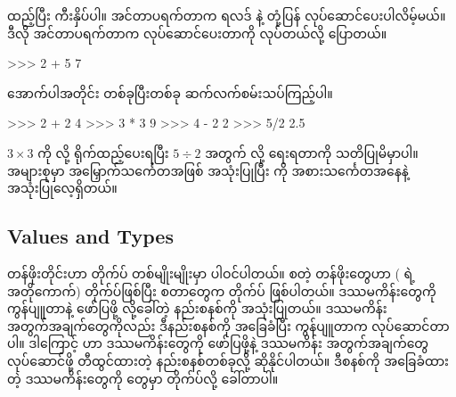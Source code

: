  ထည့်ပြီး  ကီးနှိပ်ပါ။ အင်တာပရက်တာက ရလဒ်  နဲ့ တုံ့ပြန် လုပ်ဆောင်ပေးပါလိမ့်မယ်။ ဒီလို အင်တာပရက်တာက လုပ်ဆောင်ပေးတာကို   လုပ်တယ်လို့ ပြောတယ်။
%
\setlength{\fboxsep}{0pt}
\begin{codetxt}
>>> 2 + 5
7
\end{codetxt}


%
အောက်ပါအတိုင်း တစ်ခုပြီးတစ်ခု ဆက်လက်စမ်းသပ်ကြည့်ပါ။
%
\setlength{\fboxsep}{0pt}
\begin{codetxt}
>>> 2 + 2
4
>>> 3 * 3
9
>>> 4 - 2
2
>>> 5/2
2.5
\end{codetxt}
%
$3 \times 3$ ကို  လို့ ရိုက်ထည့်ပေးရပြီး $5 \div 2$ အတွက်  လို့ ရေးရတာကို သတိပြုမိမှာပါ။  အများစုမှာ \fCode{*}  အမြှောက်သင်္ကေတအဖြစ် အသုံးပြုပြီး \fCode{/}  ကို အစားသင်္ကေတအနေနဲ့ အသုံးပြုလေ့ရှိတယ်။


\subsection*{Values and Types}
တန်ဖိုးတိုင်းဟာ တိုက်ပ်  တစ်မျိုးမျိုးမှာ ပါဝင်ပါတယ်။  \fEn{,} \fEn{,}   စတဲ့ တန်ဖိုးတွေဟာ  ( ရဲ့ အတိုကောက်) တိုက်ပ်ဖြစ်ပြီး 
\fEn{,} \fEn{,}  စတာတွေက  တိုက်ပ် ဖြစ်ပါတယ်။ ဒဿမကိန်းတွေကို ကွန်ပျူတာနဲ့ ဖော်ပြဖို့  လို့ခေါ်တဲ့ နည်းစနစ်ကို အသုံးပြုတယ်။ ဒဿမကိန်း အတွက်အချက်တွေကိုလည်း ဒီနည်းစနစ်ကို အခြေခံပြီး ကွန်ပျူတာက လုပ်ဆောင်တာပါ။ ဒါကြောင့်  ဟာ ဒဿမကိန်းတွေကို ဖော်ပြဖို့နဲ့ ဒဿမကိန်း အတွက်အချက်တွေ လုပ်ဆောင်ဖို့ တီထွင်ထားတဲ့ နည်းစနစ်တစ်ခုလို့ ဆိုနိုင်ပါတယ်။ ဒီစနစ်ကို အခြေခံထားတဲ့ ဒဿမကိန်းတွေကို  တွေမှာ  တိုက်ပ်လို့ ခေါ်တာပါ။


